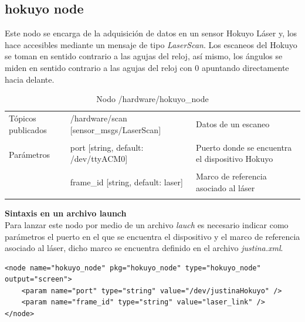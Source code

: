 \documentclass[user_manual.tex]{subfiles}
\begin{document}
\subsection{hokuyo node}
Este nodo se encarga de la adquisición de datos en un sensor Hokuyo Láser y, los hace accesibles mediante un mensaje de tipo \textit{LaserScan}. Los escaneos del Hokuyo se toman en sentido contrario a las agujas del reloj, así mismo, los ángulos se miden en sentido contrario a las agujas del reloj con 0 apuntando directamente hacia delante.
\begin{table}[H]
\begin{center}
\begin{tabular}{|l|p{6.5cm}|p{4.5cm}|}%
\hline

Tópicos publicados
& /hardware/scan [sensor\_msgs/LaserScan] & Datos de un escaneo \\
& & \\
\hline

\multirow{2}{*}{Parámetros} 
&  port [string, default: /dev/ttyACM0] & Puerto donde se encuentra el dispositivo Hokuyo \\
& & \\
& frame\_id [string, default: laser]  & Marco de referencia asociado al láser \\
& & \\
\cline{1-3}

\end{tabular}
\caption{Nodo /hardware/hokuyo\_node}
\label{hokuyo node}
\end{center}
\end{table}

\textbf{Sintaxis en un archivo launch}\\
Para lanzar este nodo por medio de un archivo \textit{lauch} es necesario indicar como parámetros el puerto en el que se encuentra el dispositivo y el marco de referencia asociado al láser, dicho marco se encuentra definido en el archivo \textit{justina.xml}.\\
\begin{verbatim}
<node name="hokuyo_node" pkg="hokuyo_node" type="hokuyo_node" output="screen">
    <param name="port" type="string" value="/dev/justinaHokuyo" />
    <param name="frame_id" type="string" value="laser_link" />
</node>
\end{verbatim}

\end{document}
